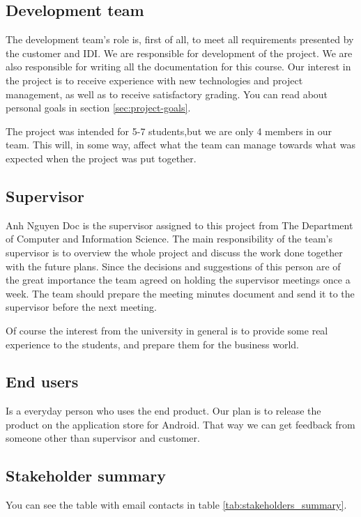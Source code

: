 \subsection{Development team}
 The development team's role is, first of all, to meet all requirements presented by the customer and IDI. We are responsible for development of the project. We are also responsible for writing all the documentation for this course.  Our interest in the project is to receive experience with new technologies and project management, as well as to receive satisfactory grading. You can read about personal goals in section \ref{sec:project-goals}. 
 
 The project was intended for 5-7 students,but we are only 4 members in our team. This will, in some way, affect what the team can manage towards what was expected when the project was put together.

\subsection{Supervisor}

Anh Nguyen Doc is the supervisor assigned to this project from The Department of Computer and Information Science. The main responsibility of the team's supervisor is to overview the whole project and discuss the work done together with the future plans. Since the decisions and suggestions of this person are of the great importance the team agreed on holding the supervisor meetings once a week. The team should prepare the meeting minutes document and send it to the supervisor before the next meeting.


Of course the interest from the university in general is to provide some real experience to the students, and prepare them for the business world.


\subsection{End users}
Is a everyday person who uses the end product. Our plan is to release the product on the application store for Android. That way we can get feedback from someone other than supervisor and customer. 
\subsection{Stakeholder summary}
You can see the table with email contacts in table \ref{tab:stakeholders_summary}.

